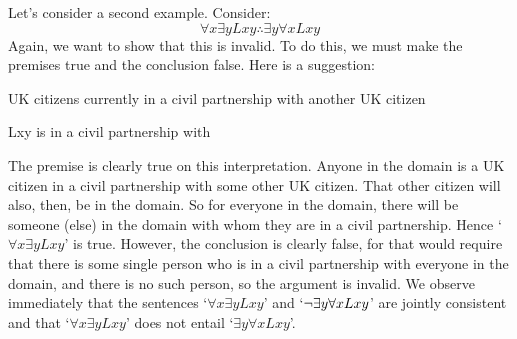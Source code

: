 Let's consider a second example. Consider:
	$$\forall x \exists y Lxy \therefore \exists y \forall x Lxy$$
Again, we want to show that this is invalid. To do this, we must make the premises true and the conclusion false. Here is a suggestion:
	\begin{ekey}
		\item[\text{domain}] UK citizens currently in a civil partnership with another UK citizen
		\item[Lxy]  is in a civil partnership with 
	\end{ekey}
The premise is clearly true on this interpretation. Anyone in the domain is a UK citizen in a civil partnership with some other UK citizen. That other citizen will also, then, be in the domain. So for everyone in the domain, there will be someone (else) in the domain with whom they are in a civil partnership. Hence `$\forall x \exists y Lxy$' is true. However, the conclusion is clearly false, for that would require that there is some single person who is in a civil partnership with everyone in the domain, and there is no such person, so the argument is invalid. We observe immediately that the sentences `$\forall x \exists y Lxy$' and `$\neg\exists y \forall x Lxy$' are jointly consistent and that `$\forall x \exists y Lxy$' does not entail `$\exists y \forall x Lxy$'. 

